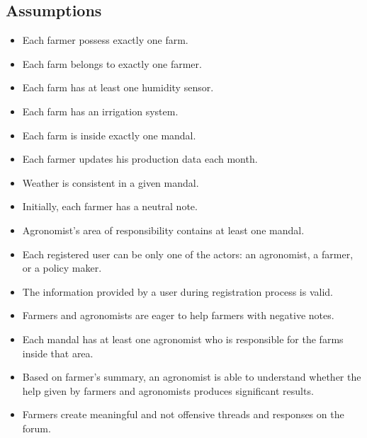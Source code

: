 \subsection{Assumptions}
\begin{itemize}
    \item Each farmer possess exactly one farm.
    \item Each farm belongs to exactly one farmer.
    \item Each farm has at least one humidity sensor.
    \item Each farm has an irrigation system.
    \item Each farm is inside exactly one mandal.
    \item Each farmer updates his production data each month.
    \item Weather is consistent in a given mandal.
    \item Initially, each farmer has a neutral note.
    \item Agronomist's area of responsibility contains at least one mandal.
    \item Each registered user can be only one of the actors: an agronomist, a farmer, or a policy maker.
    \item The information provided by a user during registration process is valid.
    \item Farmers and agronomists are eager to help farmers with negative notes.
    \item Each mandal has at least one agronomist who is responsible for the farms inside that area.
    \item Based on farmer's summary, an agronomist is able to understand whether the help given by farmers and agronomists produces significant results.
    \item Farmers create meaningful and not offensive threads and responses on the forum. 
\end{itemize}
